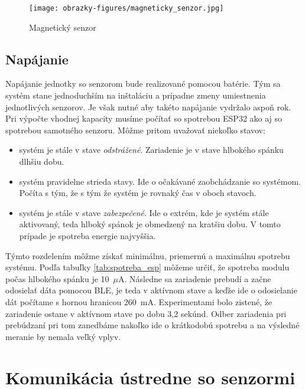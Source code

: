 \begin{figure}[ht]
    \centering
    \texttt{[image: obrazky-figures/magneticky\_senzor.jpg]}
    \caption[Magnetický senzor]{Magnetický senzor\footnotemark}
    \label{fig:magneticky_senzor}
\end{figure}

\subsection{Napájanie}

Napájanie jednotky so senzorom bude realizované pomocou batérie. Tým sa systém stane jednoduchším na inštaláciu a prípadne zmeny umiestnenia jednotlivých senzorov. Je však nutné aby takéto napájanie vydržalo aspoň rok. Pri výpočte vhodnej kapacity musíme počítať so spotrebou ESP32 ako aj so spotrebou samotného senzoru. Môžme pritom uvažovať niekoľko stavov:
\begin{itemize}
    \item systém je stále v stave \textit{odstrážené}. Zariadenie je v stave hlbokého spánku dlhšiu dobu.
    \item systém pravidelne strieda stavy. Ide o očakávané zaobchádzanie so systémom. Počíta s tým, že s tým že systém je rovnaký čas v oboch stavoch.
    \item systém je stále v stave \textit{zabezpečené}. Ide o extrém, kde je systém stále aktivovaný, teda hlboký spánok je obmedzený na kratšiu dobu. V tomto prípade je spotreba energie najvyššia.
\end{itemize}

Týmto rozdelením môžme získať minimálnu, priemernú a maximálnu spotrebu systému. Podľa tabuľky \ref{tab:spotreba_esp} môžeme určiť, že spotreba modulu počas hlbokého spánku je 10~$\mu$A. Následne sa zariadenie prebudí a začne odosielať dáta pomocou BLE, je teda v aktívnom stave a keďže ide o odosielanie dát počítame s hornou hranicou 260~mA. Experimentami bolo zistené, že zariadenie ostane v aktívnom stave po dobu 3,2 sekúnd. Odber zariadenia pri prebúdzaní pri tom zanedbáme nakoľko ide o krátkodobú spotrebu a na výsledné meranie by nemala veľký vplyv. 

\section{Komunikácia ústredne so senzormi}\label{sec:komunikacia}

